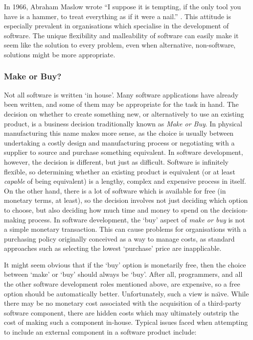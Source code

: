 In 1966, Abraham Maslow wrote \enquote{I suppose it is tempting, if the only tool you have is a hammer, to treat everything as if it were a nail.} \citep{Maslow1966}. This attitude is especially prevalent in organisations which specialise in the development of software. The unique flexibility and malleability of software can easily make it seem like the solution to every problem, even when alternative, non-software, solutions might be more appropriate.

\subsubsection{Make or Buy?}

Not all software is written `in house'. Many software applications have already been written, and some of them may be appropriate for the task in hand. The decision on whether to create something new, or alternatively to use an existing product, is a business decision traditionally known as \emph{Make or Buy}. In physical manufacturing this name makes more sense, as the choice is usually between undertaking a costly design and manufacturing process or negotiating with a supplier to source and purchase something equivalent. In software development, however, the decision is different, but just as difficult. Software is infinitely flexible, so determining whether an existing product is equivalent (or at least \emph{capable} of being equivalent) is a lengthy, complex and expensive process in itself. On the other hand, there is a lot of software which is available for free (in monetary terms, at least), so the decision involves not just deciding which option to choose, but also deciding how much time and money to spend on the decision-making process. In software development, the `buy' aspect of \emph{make or buy} is not a simple monetary transaction. This can cause problems for organisations with a purchasing policy originally conceived as a way to manage costs, as standard approaches such as selecting the lowest `purchase' price are inapplicable.

It might seem obvious that if the `buy' option is monetarily free, then the choice between `make' or `buy' should always be `buy'. After all, programmers, and all the other software development roles mentioned above, are expensive, so a free option should be automatically better. Unfortunately, such a view is na\"{\i}ve. While there may be no monetary cost associated with the acquisition of a third-party software component, there are hidden costs which may ultimately outstrip the cost of making such a component in-house. Typical issues faced when attempting to include an external component in a software product include:

